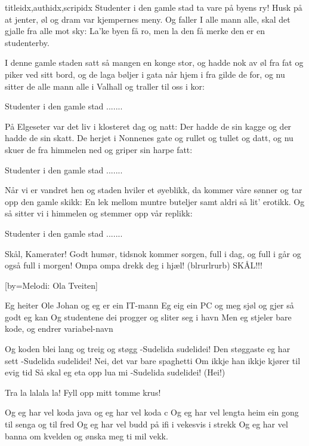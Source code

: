 \documentclass[14pt,letterpaper,norsk]{article}
\begin{document}
\begin{songs}{titleidx,authidx,scripidx}
\beginchorus
Studenter i den gamle stad ta vare på byens ry!
Husk på at jenter, øl og dram var kjempernes meny.
Og faller I alle mann alle, skal det gjalle fra alle mot sky:
La'ke byen få ro, men la den få merke den er en studenterby.
\endchorus

\beginverse
I denne gamle staden satt så mangen en konge stor,
og hadde nok av øl fra fat og piker ved sitt bord,
og de laga bøljer i gata når hjem i fra gilde de for,
og nu sitter de alle mann alle i Valhall og traller til oss i kor:
\endverse

\beginchorus
Studenter i den gamle stad .......
\endchorus

\beginverse
På Elgeseter var det liv i klosteret dag og natt:
Der hadde de sin kagge og der hadde de sin skatt.
De herjet i Nonnenes gate og rullet og tullet og datt,
og nu skuer de fra himmelen ned og griper sin harpe fatt:
\endverse

\beginchorus
Studenter i den gamle stad .......
\endchorus

\beginverse
Når vi er vandret hen og staden hviler et øyeblikk,
da kommer våre sønner og tar opp den gamle skikk:
En lek mellom muntre buteljer samt aldri så lit' erotikk.
Og så sitter vi i himmelen og stemmer opp vår replikk:
\endverse

\beginchorus
Studenter i den gamle stad .......
\endchorus

\endsong


\beginverse
Skål, Kamerater!  
Godt humør,   
tidsnok kommer sorgen,  
full i dag, og full i går  
og også full i morgen!  
Ompa ompa drekk deg i hjæl!  
(blrurlrurb) SKÅL!!!  
\endverse

\endsong

[by=Melodi: Ola Tveiten]

\beginverse
Eg heiter Ole Johan og eg er ein IT-mann
Eg eig ein PC og meg sjøl og gjer så godt eg kan
Og studentene dei progger og sliter seg i havn
Men eg stjeler bare kode, og endrer variabel-navn
\endverse

\beginchorus
Og koden blei lang og treig og støgg
-Sudelida sudelidei!
Den støggaste eg har sett
-Sudelida sudelidei!
Nei, det var bare spaghetti
Om ikkje han ikkje kjører til evig tid
Så skal eg eta opp lua mi
-Sudelida sudelidei! (Hei!)
\endchorus

\beginchorus
Tra la lalala la!
Fyll opp mitt tomme krus!
\endchorus

\beginverse
Og eg har vel koda java og eg har vel koda c
Og eg har vel lengta heim ein gong til senga og til fred
Og eg har vel budd på ifi i vekesvis i strekk
Og eg har vel banna om kvelden og ønska meg ti mil vekk.
\endverse


\end{songs}
\end{document}
